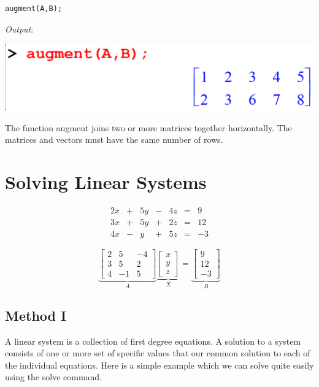 \documentclass[
]{book}
\theoremstyle{definition}
\theoremstyle{definition}
\theoremstyle{definition}
\theoremstyle{definition}
\theoremstyle{remark}
\begin{document}
\begin{verbatim}
augment(A,B);
\end{verbatim}

\emph{Output}:

\includegraphics{figures/Lesson 5/fig3.png}

The function augment joins two or more matrices together horizontally.
The matrices and vectors must have the same number of rows.

\section{Solving Linear Systems}\label{solving-linear-systems}

\[ \begin{array}{ccccccc} 
2x &+& 5y &-& 4z &=& 9 \\
3x &+& 5y &+& 2z &=& 12 \\
4x &-& y  &+& 5z &=& -3 
\end{array} \]

\[
\underbrace{\begin{bmatrix}
2 & 5 & -4 \\
3 & 5 & 2   \\
4 & -1 & 5  
\end{bmatrix}}_A
\underbrace{\begin{bmatrix}
x \\ y\\z
\end{bmatrix}}_X
=
\underbrace{\begin{bmatrix}
9\\12\\-3
\end{bmatrix}}_B
\]

\subsection{Method I}\label{method-i}

A linear system is a collection of first degree equations.
A solution to a system consists of one or more set of specific values that our common solution to each of the individual equations.
Here is a simple example which we can solve quite easily using the solve command.
\end{document}
